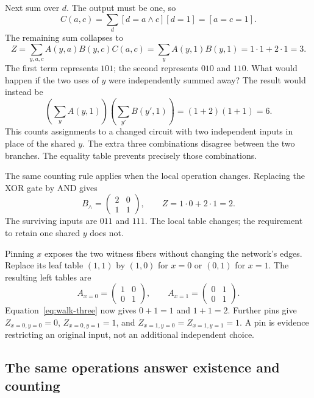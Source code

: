 Next sum over $d$. The output must be one, so
\[
 C(a,c)=\sum_d[d=a\land c][d=1]=[a=c=1].
\]
The remaining sum collapses to
\begin{equation}\label{eq:walk-three}
 Z=\sum_{y,a,c}A(y,a)B(y,c)C(a,c)
  =\sum_y A(y,1)B(y,1)=1\cdot1+2\cdot1=3.
\end{equation}
The first term represents $101$; the second represents $010$ and $110$.
What would happen if the two uses of $y$ were independently summed away?
The result would instead be
\[
 \left(\sum_y A(y,1)\right)
 \left(\sum_{y'}B(y',1)\right)=(1+2)(1+1)=6.
\]
This counts assignments to a changed circuit with two independent inputs
in place of the shared $y$. The extra three combinations disagree between
the two branches. The equality table prevents precisely those combinations.

The same counting rule applies when the local operation changes.
Replacing the XOR gate by AND gives
\[
 B_{\land}=\begin{pmatrix}2&0\\1&1\end{pmatrix},
 \qquad Z=1\cdot0+2\cdot1=2.
\]
The surviving inputs are $011$ and $111$. The local table changes;
the requirement to retain one shared $y$ does not.

Pinning $x$ exposes the two witness fibers without changing the network's
edges. Replace its leaf table $(1,1)$ by $(1,0)$ for $x=0$ or $(0,1)$
for $x=1$. The resulting left tables are
\[
 A_{x=0}=\begin{pmatrix}1&0\\0&1\end{pmatrix},\qquad
 A_{x=1}=\begin{pmatrix}0&1\\0&1\end{pmatrix}.
\]
Equation~\eqref{eq:walk-three} now gives $0+1=1$ and $1+1=2$.
Further pins give $Z_{x=0,y=0}=0$, $Z_{x=0,y=1}=1$, and
$Z_{x=1,y=0}=Z_{x=1,y=1}=1$. A pin is evidence restricting an original
input, not an additional independent choice.

\subsection{The same operations answer existence and counting}

